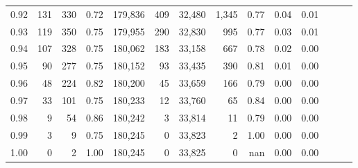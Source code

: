 \begin{tabular}{rrrrrrrrrrrrrr}
0.92 &    131 &  330 &  0.72 &  179,836 &      409 &  32,480 &   1,345 &  0.77 &  0.04 &      0.01 \\
0.93 &    119 &  350 &  0.75 &  179,955 &      290 &  32,830 &     995 &  0.77 &  0.03 &      0.01 \\
0.94 &    107 &  328 &  0.75 &  180,062 &      183 &  33,158 &     667 &  0.78 &  0.02 &      0.00 \\
0.95 &     90 &  277 &  0.75 &  180,152 &       93 &  33,435 &     390 &  0.81 &  0.01 &      0.00 \\
0.96 &     48 &  224 &  0.82 &  180,200 &       45 &  33,659 &     166 &  0.79 &  0.00 &      0.00 \\
0.97 &     33 &  101 &  0.75 &  180,233 &       12 &  33,760 &      65 &  0.84 &  0.00 &      0.00 \\
0.98 &      9 &   54 &  0.86 &  180,242 &        3 &  33,814 &      11 &  0.79 &  0.00 &      0.00 \\
0.99 &      3 &    9 &  0.75 &  180,245 &        0 &  33,823 &       2 &  1.00 &  0.00 &      0.00 \\
1.00 &      0 &    2 &  1.00 &  180,245 &        0 &  33,825 &       0 &   nan &  0.00 &      0.00 \\
\bottomrule
\end{tabular}
